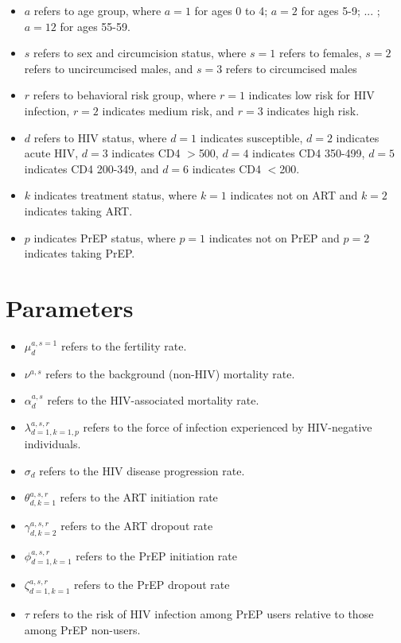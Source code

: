 \documentclass[11pt,a4paper]{article}
\begin{document}
\begin{itemize}
\item $a$ refers to age group, where $a = 1$ for ages 0 to 4; $a = 2$ for ages 5-9; ... ; $a = 12$ for ages 55-59.
\item $s$ refers to sex and circumcision status, where $s = 1$ refers to females, $s = 2$ refers to uncircumcised males, and $s = 3$ refers to circumcised males
\item $r$ refers to behavioral risk group, where $r = 1$ indicates low risk for HIV infection, $r = 2$ indicates medium risk, and $r = 3$ indicates high risk.
\item $d$ refers to HIV status, where $d = 1$ indicates susceptible, $d = 2$ indicates acute HIV, $d = 3$ indicates CD4 $>$500, $d = 4$ indicates CD4 350-499, $d = 5$ indicates CD4 200-349, and $d = 6$ indicates CD4 $<$200.
\item $k$ indicates treatment status, where $k = 1$ indicates not on ART and $k = 2$ indicates taking ART.
\item $p$ indicates PrEP status, where $p = 1$ indicates not on PrEP and $p = 2$ indicates taking PrEP.
\end{itemize}

\section{Parameters}
\begin{itemize}
\item $\mu_{d}^{a,s = 1}$ refers to the fertility rate.
\item $\nu^{a,s}$ refers to the background (non-HIV) mortality rate.
\item $\alpha_{d}^{a,s}$ refers to the HIV-associated mortality rate.
\item $\lambda_{d = 1,k = 1,p}^{a,s,r}$ refers to the force of infection experienced by HIV-negative individuals. 
\item $\sigma_{d}$ refers to the HIV disease progression rate.
\item $\theta_{d, k = 1}^{a,s,r}$ refers to the ART initiation rate
\item $\gamma_{d, k = 2}^{a,s,r}$ refers to the ART dropout rate
\item $\phi_{d = 1, k = 1}^{a,s,r}$ refers to the PrEP initiation rate
\item $\zeta_{d = 1, k = 1}^{a,s,r}$ refers to the PrEP dropout rate
\item $\tau$ refers to the risk of HIV infection among PrEP users relative to those among PrEP non-users.
\end{itemize}
\end{document}

